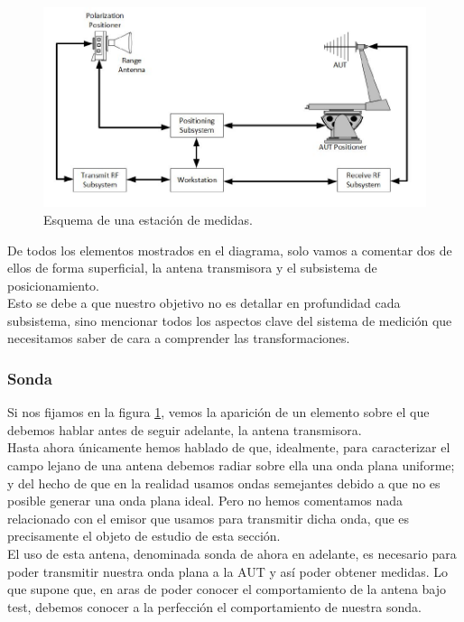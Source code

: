 \documentclass{article}
\begin{document}
\begin{figure}[h]
    \centering
    \includegraphics[scale=0.75]{Figura3-Modelo de una estacion completa de medidas}
    \caption{Esquema de una estación de medidas.}
    \label{Modelo-general-de-una-estación-de-medidas}
\end{figure}

De todos los elementos mostrados en el diagrama, solo vamos a comentar dos de ellos de forma superficial, la antena transmisora y el subsistema de posicionamiento.\\
Esto se debe a que nuestro objetivo no es detallar en profundidad cada subsistema, sino mencionar todos los aspectos clave del sistema de medición que necesitamos saber de cara a comprender las transformaciones.

\newpage

\subsubsection{Sonda} 

Si nos fijamos en la figura \ref{Modelo-general-de-una-estación-de-medidas}, vemos la aparición de un elemento sobre el que debemos hablar antes de seguir adelante, la antena transmisora.\\
Hasta ahora únicamente hemos hablado de que, idealmente, para caracterizar el campo lejano de una antena debemos radiar sobre ella una onda plana uniforme; y del hecho de que en la realidad usamos ondas semejantes debido a que no es posible generar una onda plana ideal. Pero no hemos comentamos nada relacionado con el emisor que usamos para transmitir dicha onda, que es precisamente el objeto de estudio de esta sección.
\\

El uso de esta antena, denominada sonda de ahora en adelante, es necesario para poder transmitir nuestra onda plana a la AUT y así poder obtener medidas. Lo que supone que, en aras de poder conocer el comportamiento de la antena bajo test, debemos conocer a la perfección el comportamiento de nuestra sonda.
\\
\end{document}

